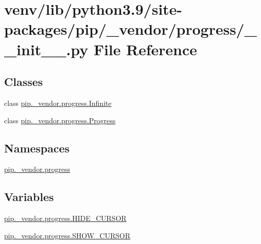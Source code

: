 \hypertarget{venv_2lib_2python3_89_2site-packages_2pip_2__vendor_2progress_2____init_____8py}{}\section{venv/lib/python3.9/site-\/packages/pip/\+\_\+vendor/progress/\+\_\+\+\_\+init\+\_\+\+\_\+.py File Reference}
\label{venv_2lib_2python3_89_2site-packages_2pip_2__vendor_2progress_2____init_____8py}
\subsection*{Classes}
\begin{DoxyCompactItemize}
\item 
class \hyperlink{classpip_1_1__vendor_1_1progress_1_1Infinite}{pip.\+\_\+vendor.\+progress.\+Infinite}
\item 
class \hyperlink{classpip_1_1__vendor_1_1progress_1_1Progress}{pip.\+\_\+vendor.\+progress.\+Progress}
\end{DoxyCompactItemize}
\subsection*{Namespaces}
\begin{DoxyCompactItemize}
\item 
 \hyperlink{namespacepip_1_1__vendor_1_1progress}{pip.\+\_\+vendor.\+progress}
\end{DoxyCompactItemize}
\subsection*{Variables}
\begin{DoxyCompactItemize}
\item 
\hyperlink{namespacepip_1_1__vendor_1_1progress_ae14bb679fb4fbef92d4a2a73c69cf003}{pip.\+\_\+vendor.\+progress.\+H\+I\+D\+E\+\_\+\+C\+U\+R\+S\+OR}
\item 
\hyperlink{namespacepip_1_1__vendor_1_1progress_aec81b7faa5ee1e5ec2fe9dc6c1c7dbf1}{pip.\+\_\+vendor.\+progress.\+S\+H\+O\+W\+\_\+\+C\+U\+R\+S\+OR}
\end{DoxyCompactItemize}
